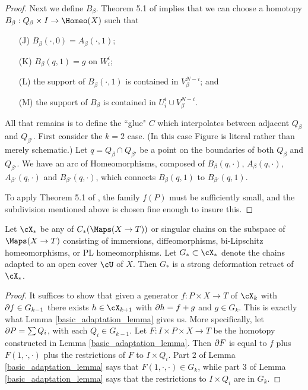 {\begin{proof}
Next we define $B_\beta$.
Theorem 5.1 of \cite{MR0283802} implies that we can choose a homotopy $B_\beta:Q_\beta\times I\to \Homeo(X)$
such that
\begin{itemize}
\item[(J)] $B_\beta(\cdot, 0) = A_\beta(\cdot, 1)$;
\item[(K)] $B_\beta(q,1) = g$ on $W_i^i$;
\item[(L)] the support of $B_\beta(\cdot,1)$ is contained in $V_\beta^{N-i}$; and
\item[(M)] the support of $B_\beta$ is contained in $U_i^i \cup V_\beta^{N-i}$.
\end{itemize}

All that remains is to define the ``glue" $C$ which interpolates between adjacent $Q_\beta$ and $Q_{\beta'}$.
First consider the $k=2$ case.
(In this case Figure  is literal rather than merely schematic.)
Let $q = Q_\beta \cap Q_{\beta'}$ be a point on the boundaries of both $Q_\beta$ and $Q_{\beta'}$.
We have an arc of Homeomorphisms, composed of $B_\beta(q, \cdot)$, $A_\beta(q, \cdot)$, 
$A_{\beta'}(q, \cdot)$ and $B_{\beta'}(q, \cdot)$, which connects $B_\beta(q, 1)$ to $B_{\beta'}(q, 1)$.







To apply Theorem 5.1 of \cite{MR0283802}, the family $f(P)$ must be sufficiently small,
and the subdivision mentioned above is chosen fine enough to insure this.

\end{proof}

} %

\begin{lemma} \label{extension_lemma_c}
Let $\cX_*$ be any of $C_*(\Maps(X \to T))$ or singular chains on the 
subspace of $\Maps(X\to T)$ consisting of immersions, diffeomorphisms, 
bi-Lipschitz homeomorphisms, or PL homeomorphisms.
Let $G_* \subset \cX_*$ denote the chains adapted to an open cover $\cU$
of $X$.
Then $G_*$ is a strong deformation retract of $\cX_*$.
\end{lemma}
\begin{proof}
It suffices to show that given a generator $f:P\times X\to T$ of $\cX_k$ with
$\partial f \in G_{k-1}$ there exists $h\in \cX_{k+1}$ with $\partial h = f + g$ and $g \in G_k$.
This is exactly what Lemma \ref{basic_adaptation_lemma}
gives us.
More specifically, let $\partial P = \sum Q_i$, with each $Q_i\in G_{k-1}$.
Let $F: I\times P\times X\to T$ be the homotopy constructed in Lemma \ref{basic_adaptation_lemma}.
Then $\partial F$ is equal to $f$ plus $F(1, \cdot, \cdot)$ plus the restrictions of $F$ to $I\times Q_i$.
Part 2 of Lemma \ref{basic_adaptation_lemma} says that $F(1, \cdot, \cdot)\in G_k$,
while part 3 of Lemma \ref{basic_adaptation_lemma} says that the restrictions to $I\times Q_i$ are in $G_k$.
\end{proof}

